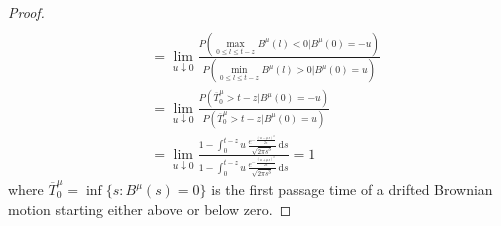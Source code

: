 \begin{proof}
\begin{align*}
	\\
	&=
	\lim_{u \downarrow 0 } 
	\frac{
		P ( \max_{0 \leq l \leq t - z } B^\mu ( l ) < 0  | B^\mu(0) =  - u)
	}{P ( \min_{0 \leq l \leq t -z } B^\mu ( l ) > 0  | B^\mu(0) =  u)}
	\\
	&=
	\lim_{u \downarrow 0 } 
	\frac{
		P ( \overline T_0^\mu > t -z   | B^\mu(0) =  - u)
	}{P ( \overline T_0^\mu > t -z   | B^\mu(0) =  u)}
	\\
	&=
	\lim_{u \downarrow 0 } 
	\frac{
		1 - \int_0^{t-z} 
		u \, \frac{
		e^{ - \frac{ (u - \mu s ) ^ 2 }{2 s } }	
	}{\sqrt{2 \pi s^3}} \, \mathrm d s
	}{
	1 - \int_0^{t-z} 
	u \, \frac{
		e^{ - \frac{ (u + \mu s ) ^ 2 }{2 s } }	
	}{\sqrt{2 \pi s^3}} \, \mathrm d s
	}
	=
	1 
	\end{align*}
	where
	$  \overline T _ 0 ^ \mu = \inf\{ s : B^\mu(s) = 0\} $ is the first passage time of a drifted 
	Brownian motion starting either above or below zero. 
	

\end{proof}
